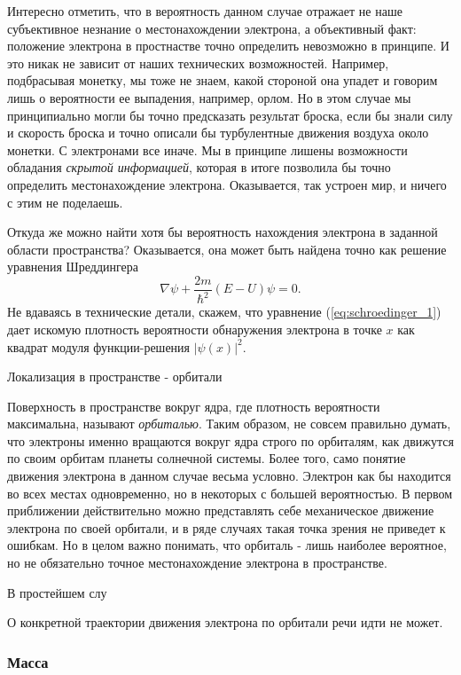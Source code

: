 Интересно отметить, что в вероятность данном случае отражает не наше субъективное незнание о местонахождении электрона, а объективный факт: положение электрона в простнастве точно определить невозможно в принципе.
И это никак не зависит от наших технических возможностей. 
Например, подбрасывая монетку, мы тоже не знаем, какой стороной она упадет и говорим лишь о вероятности ее выпадения, например, орлом.
Но в этом случае мы принципиально могли бы точно предсказать результат броска, если бы знали силу и скорость броска и точно описали бы турбулентные движения воздуха около монетки.
С электронами все иначе.
Мы в принципе лишены возможности обладания \textit{скрытой информацией}, которая в итоге позволила бы точно определить местонахождение электрона.
Оказывается, так устроен мир, и ничего с этим не поделаешь. 

Откуда же можно найти хотя бы вероятность нахождения электрона в заданной области пространства?
Оказывается, она может быть найдена точно как решение уравнения Шреддингера
\begin{equation}\label{eq:schroedinger_1}
\nabla\psi + \frac{2m}{\hbar^2}(E - U)\psi = 0.
\end{equation}
Не вдаваясь в технические детали, скажем, что уравнение (\ref{eq:schroedinger_1}) дает искомую плотность вероятности обнаружения электрона в точке $x$ как квадрат модуля функции-решения $|\psi(x)|^2$.



Локализация в пространстве - орбитали


Поверхность в пространстве вокруг ядра, где плотность вероятности максимальна, называют \textit{орбиталью}.
Таким образом, не совсем правильно думать, что электроны именно вращаются вокруг ядра строго по орбиталям, как движутся по своим орбитам планеты солнечной системы.
Более того, само понятие движения электрона в данном случае весьма условно.
Электрон как бы находится во всех местах одновременно, но в некоторых с большей вероятностью. 
В первом приближении действительно можно представлять себе механическое движение электрона по своей орбитали, и в ряде случаях такая точка зрения не приведет к ошибкам.
Но в целом важно понимать, что орбиталь - лишь наиболее вероятное, но не обязательно точное местонахождение электрона в пространстве.

В простейшем слу


О конкретной траектории движения электрона по орбитали речи идти не может.




\subsubsection*{Масса}

